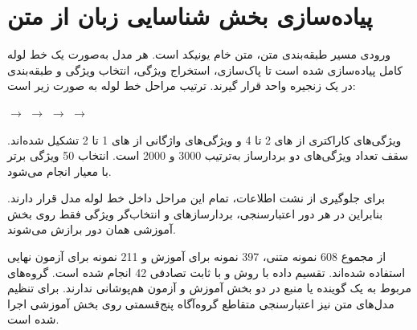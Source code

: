 


\section{پیاده‌سازی بخش شناسایی زبان از متن}

ورودی مسیر طبقه‌بندی متن، متن خام یونیکد است. هر مدل به‌صورت یک خط لوله کامل پیاده‌سازی شده است تا پاک‌سازی، استخراج ویژگی، انتخاب ویژگی و طبقه‌بندی در یک زنجیره واحد قرار گیرند. ترتیب مراحل خط لوله به صورت زیر است:

\begin{center}
$\longrightarrow$
$\longrightarrow$
$\longrightarrow$
$\longrightarrow$
\end{center}

ویژگی‌های کاراکتری از
های 2 تا 4 و ویژگی‌های واژگانی از
های 1 تا 2 تشکیل شده‌اند. سقف تعداد ویژگی‌های دو بردارساز به‌ترتیب 3000 و 2000 است. انتخاب 50 ویژگی برتر با معیار
انجام می‌شود.

برای جلوگیری از نشت اطلاعات، تمام این مراحل داخل خط لوله مدل قرار دارند. بنابراین در هر دور اعتبارسنجی، بردارسازهای
و انتخاب‌گر ویژگی فقط روی بخش آموزشی همان دور برازش می‌شوند.

از مجموع 608 نمونه متنی، 397 نمونه برای آموزش و 211 نمونه برای آزمون نهایی استفاده شده‌اند. تقسیم داده با روش
و با ثابت تصادفی 42 انجام شده است. گروه‌های مربوط به یک گوینده یا منبع در دو بخش آموزش و آزمون هم‌پوشانی ندارند. برای تنظیم مدل‌های متن نیز اعتبارسنجی متقاطع گروه‌آگاه پنج‌قسمتی روی بخش آموزشی اجرا شده است.

